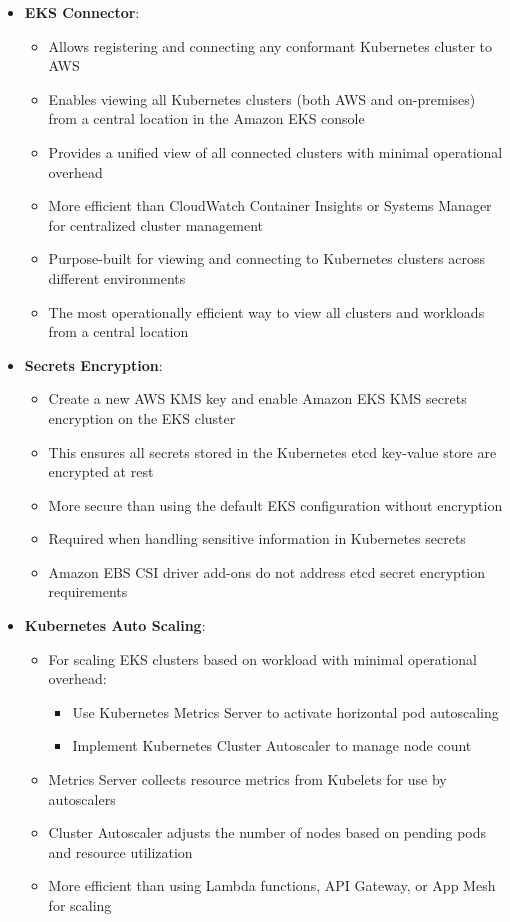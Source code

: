 \documentclass[11pt,a4paper]{report}
\begin{document}
\begin{itemize}
\begin{itemize}
  \item Provides more container-aware monitoring than CloudTrail or AWS App Mesh
\end{itemize}
  \item \textbf{EKS Connector}:
\begin{itemize}
  \item Allows registering and connecting any conformant Kubernetes cluster to AWS
  \item Enables viewing all Kubernetes clusters (both AWS and on-premises) from a central location in the Amazon EKS console
  \item Provides a unified view of all connected clusters with minimal operational overhead
  \item More efficient than CloudWatch Container Insights or Systems Manager for centralized cluster management
  \item Purpose-built for viewing and connecting to Kubernetes clusters across different environments
  \item The most operationally efficient way to view all clusters and workloads from a central location
\end{itemize}
  \item \textbf{Secrets Encryption}:
\begin{itemize}
  \item Create a new AWS KMS key and enable Amazon EKS KMS secrets encryption on the EKS cluster
  \item This ensures all secrets stored in the Kubernetes etcd key-value store are encrypted at rest
  \item More secure than using the default EKS configuration without encryption
  \item Required when handling sensitive information in Kubernetes secrets
  \item Amazon EBS CSI driver add-ons do not address etcd secret encryption requirements
\end{itemize}
  \item \textbf{Kubernetes Auto Scaling}:
\begin{itemize}
  \item For scaling EKS clusters based on workload with minimal operational overhead:
\begin{itemize}
  \item Use Kubernetes Metrics Server to activate horizontal pod autoscaling
  \item Implement Kubernetes Cluster Autoscaler to manage node count
\end{itemize}
  \item Metrics Server collects resource metrics from Kubelets for use by autoscalers
  \item Cluster Autoscaler adjusts the number of nodes based on pending pods and resource utilization
  \item More efficient than using Lambda functions, API Gateway, or App Mesh for scaling
\end{itemize}
\end{itemize}
\end{document}
